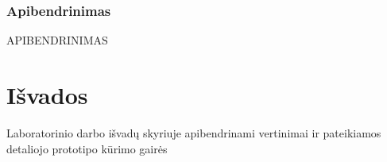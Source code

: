 \documentclass{VUMIFPSkursinis}
\begin{document}
\subsubsection{Apibendrinimas}
APIBENDRINIMAS


\section{Išvados}
Laboratorinio darbo išvadų skyriuje apibendrinami vertinimai ir pateikiamos detaliojo prototipo kūrimo gairės


















\printbibliography[heading=bibintoc, title=Šaltiniai]  %
\end{document}
